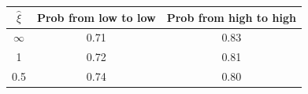 \begin{tabular}{ccc}
\hline
\rule{0pt}{1.2em}
$\widehat \xi$  &Prob from low to low& Prob from high to high \\
\hline
$\infty$ &  0.71 & 0.83 \\
1   &  0.72 & 0.81  \\
0.5 &  0.74 & 0.80\\



\hline
\end{tabular}